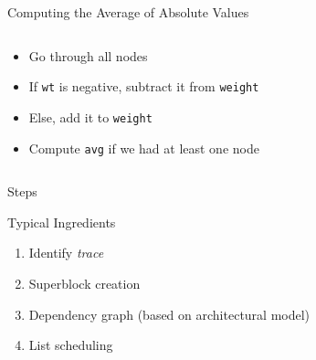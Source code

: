 \documentclass[presentation]{beamer}
\begin{document}
\begin{frame}{Computing the Average of Absolute Values}
    \begin{columns}[T]
        \begin{column}{0.53\textwidth}
            \begin{itemize}
                \item Go through all nodes
                \item If \texttt{wt} is negative, subtract it from \texttt{weight}
                \item Else, add it to \texttt{weight}
                \item Compute \texttt{avg} if we had at least one node
            \end{itemize}
        \end{column}

        \begin{column}{0.45\textwidth}
            \begin{minipage}{\textwidth}
                
                \label{ls:ls_c_chang_full_default}
            \end{minipage}
        \end{column}
    \end{columns}
\end{frame}

\begin{frame}{Steps}
        \begin{block}{Typical Ingredients}
        \begin{enumerate}
            \item Identify \textit{trace}
            \item Superblock creation
            \item Dependency graph (based on architectural model)
            \item List scheduling
        \end{enumerate}
    \end{block}
\end{frame}
\end{document}
